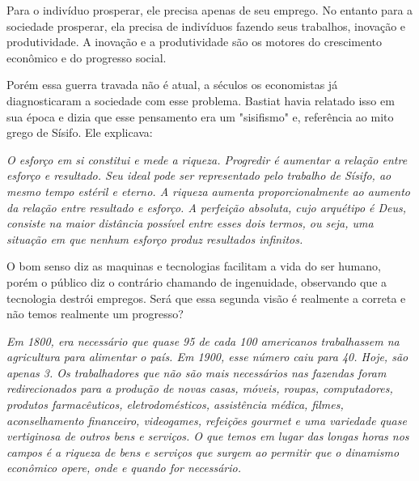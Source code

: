 Para o indivíduo prosperar, ele precisa apenas de seu emprego. No entanto para a sociedade prosperar, ela precisa de indivíduos fazendo seus trabalhos, inovação e produtividade. A inovação e a produtividade são os motores do crescimento econômico e do progresso social. 

Porém essa guerra travada não é atual, a séculos os economistas já diagnosticaram a sociedade com esse problema. Bastiat havia relatado isso em sua época e dizia que esse pensamento era um "sisifismo" e, referência ao mito grego de Sísifo. Ele explicava:

\begin{citacao}
    \textit{
        O esforço em si constitui e mede a riqueza. Progredir é aumentar a relação entre esforço e resultado. Seu ideal pode ser representado pelo trabalho de Sísifo, ao mesmo tempo estéril e eterno. \newline
        A riqueza aumenta proporcionalmente ao aumento da relação entre resultado e esforço. A perfeição absoluta, cujo arquétipo é Deus, consiste na maior distância possível entre esses dois termos, ou seja, uma situação em que nenhum esforço produz resultados infinitos.
    } \newline
    \cite{bastiat1859sofismas}
\end{citacao}

O bom senso diz as maquinas e tecnologias facilitam a vida do ser humano, porém o público diz o contrário chamando de ingenuidade, observando que a tecnologia destrói empregos. Será que essa segunda visão é realmente a correta e não temos realmente um progresso?

\begin{citacao}
    \textit{
        Em 1800, era necessário que quase 95 de cada 100 americanos trabalhassem na agricultura para alimentar o país. Em 1900, esse número caiu para 40. Hoje, são apenas 3. Os trabalhadores que não são mais necessários nas fazendas foram redirecionados para a produção de novas casas, móveis, roupas, computadores, produtos farmacêuticos, eletrodomésticos, assistência médica, filmes, aconselhamento financeiro, videogames, refeições gourmet e uma variedade quase vertiginosa de outros bens e serviços. O que temos em lugar das longas horas nos campos é a riqueza de bens e serviços que surgem ao permitir que o dinamismo econômico opere, onde e quando for necessário.
    } \newline
    \cite{Myths-of-Rich-and-Poor}
\end{citacao}

